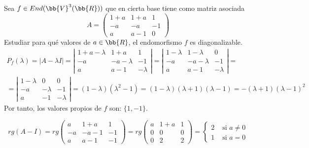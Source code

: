 \begin{ejercicio}
    Sea $f\in End(\bb{V}^3(\bb{R}))$ que en cierta base tiene como matriz asociada
    $$A=\left(\begin{array}{ccc}
        1+a & 1+a & 1 \\
        -a & -a & -1 \\
        a & a-1 & 0
    \end{array}\right)$$
    Estudiar para qué valores de $a\in \bb{R}$, el endomorfismo $f$ es diagonalizable.
    \begin{multline*}
        P_f(\lambda) = |A-\lambda I|
        = \left|\begin{array}{ccc}
            1+a-\lambda & 1+a & 1 \\
            -a & -a-\lambda & -1 \\
            a & a-1 & -\lambda
        \end{array}\right|
        = \left|\begin{array}{ccc}
            1-\lambda & 1-\lambda & 0 \\
            -a & -a-\lambda & -1 \\
            a & a-1 & -\lambda
        \end{array}\right| =\\
        = \left|\begin{array}{ccc}
            1-\lambda & 0 & 0 \\
            -a & -\lambda & -1 \\
            a & -1 & -\lambda
        \end{array}\right| = (1-\lambda)(\lambda^2 - 1) = (1-\lambda)(\lambda+1)(\lambda-1) = -(\lambda+1)(\lambda-1)^2
    \end{multline*}
    Por tanto, los valores propios de $f$ son: $\{1, -1\}$.

    \begin{equation*}
        rg(A-I) = rg\left(\begin{array}{ccc}
            a & 1+a & 1 \\
            -a & -a-1 & -1 \\
            a & a-1 & -1
        \end{array}\right) = rg\left(\begin{array}{ccc}
            a & 1+a & 1 \\
            0 & 0 & 0 \\
            0 & 2 & 2
        \end{array}\right) = \left\{
        \begin{array}{cc}
            2 & \text{ si } a\neq 0 \\
            1 & \text{ si } a= 0
        \end{array}
        \right.
    \end{equation*}


\end{ejercicio}
